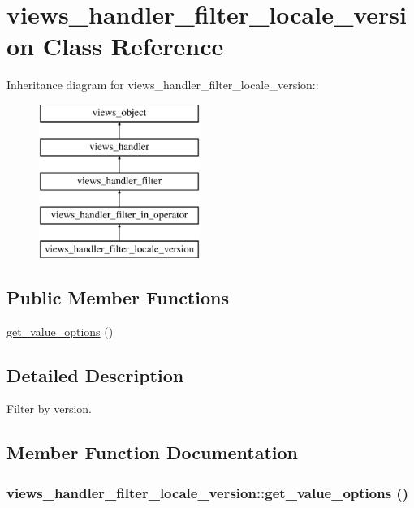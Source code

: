 \hypertarget{classviews__handler__filter__locale__version}{
\section{views\_\-handler\_\-filter\_\-locale\_\-version Class Reference}
\label{classviews__handler__filter__locale__version}
}
Inheritance diagram for views\_\-handler\_\-filter\_\-locale\_\-version::\begin{figure}[H]
\begin{center}
\leavevmode
\includegraphics[height=5cm]{classviews__handler__filter__locale__version}
\end{center}
\end{figure}
\subsection*{Public Member Functions}
\begin{CompactItemize}
\item 
\hyperlink{classviews__handler__filter__locale__version_f0f2577c03733a4f9d1cd2d931329edd}{get\_\-value\_\-options} ()
\end{CompactItemize}


\subsection{Detailed Description}
Filter by version. 

\subsection{Member Function Documentation}
\hypertarget{classviews__handler__filter__locale__version_f0f2577c03733a4f9d1cd2d931329edd}{
\subsubsection[{get\_\-value\_\-options}]{\setlength{\rightskip}{0pt plus 5cm}views\_\-handler\_\-filter\_\-locale\_\-version::get\_\-value\_\-options ()}}
\label{classviews__handler__filter__locale__version_f0f2577c03733a4f9d1cd2d931329edd}


